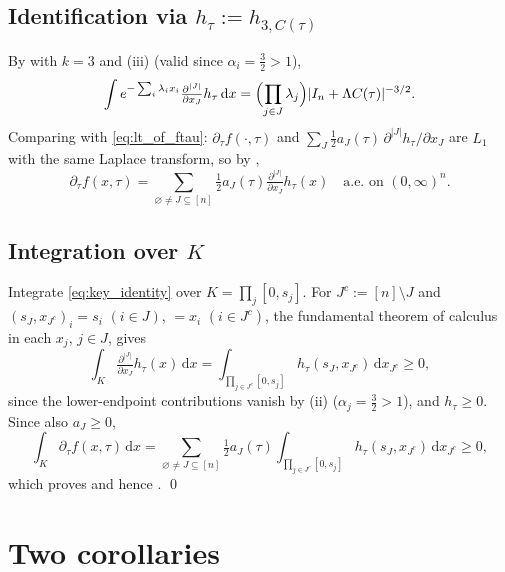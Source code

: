 \documentclass[14pt]{extarticle}
\theoremstyle{definition}
\newcommand{\dd}{\mathrm{d}}
\begin{document}
\subsection{Identification via $h_\tau:=h_{3,C(\tau)}$}

By  with $k=3$ and (iii) (valid
since $\alpha_i=\tfrac{3}{2}>1$),
\[
  \int e^{-\sum_i\lambda_ix_i}
    \tfrac{\partial^{|J|}}{\partial x_J}h_\tau\,\dd x
  =\Bigl(\prod_{j\in J}\lambda_j\Bigr)|I_n+\Lambda C(\tau)|^{-3/2}.
\]
Comparing with \eqref{eq:lt_of_ftau}: $\partial_\tau f(\cdot,\tau)$
and $\sum_J\tfrac12 a_J(\tau)\,\partial^{|J|}h_\tau/\partial x_J$ are
$L_1$ with the same Laplace transform, so by ,
\begin{equation}\label{eq:key_identity}
  \partial_\tau f(x,\tau)
  =\sum_{\varnothing\ne J\subseteq[n]}
    \tfrac{1}{2}a_J(\tau)
    \tfrac{\partial^{|J|}}{\partial x_J}h_\tau(x)
  \quad\text{a.e.\ on }(0,\infty)^n.
\end{equation}

\subsection{Integration over $K$}

Integrate \eqref{eq:key_identity} over $K=\prod_j[0,s_j]$.
For $J^c:=[n]\setminus J$ and $(s_J,x_{J^c})_i=s_i$ $(i\in J)$,
$=x_i$ $(i\in J^c)$, the fundamental theorem of calculus in each
$x_j$, $j\in J$, gives
\begin{equation}\label{eq:boundary_eval}
  \int_K\tfrac{\partial^{|J|}}{\partial x_J}h_\tau(x)\,\dd x
  =\int_{\prod_{j\in J^c}[0,s_j]}h_\tau(s_J,x_{J^c})\,\dd x_{J^c}
  \geqslant 0,
\end{equation}
since the lower-endpoint contributions vanish by
(ii) ($\alpha_j=\tfrac{3}{2}>1$), and
$h_\tau\geqslant 0$.  Since also $a_J\geqslant 0$,
\[
  \int_K\partial_\tau f(x,\tau)\,\dd x
  =\sum_{\varnothing\ne J\subseteq[n]}\tfrac{1}{2}a_J(\tau)
  \int_{\prod_{j\in J^c}[0,s_j]}h_\tau(s_J,x_{J^c})\,\dd x_{J^c}
  \geqslant 0,
\]
which proves  and hence .  \qed


\section{Two corollaries}\label{sec:corollaries}
\end{document}
